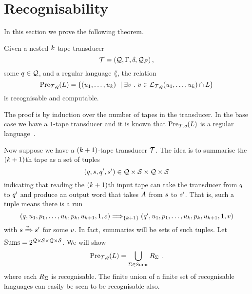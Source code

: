
\section{Recognisability}

In this section we prove the following theorem.

\begin{theorem}
    Given a nested $k$-tape transducer
    \[
        \mathcal{T} = \left(\mathcal{Q}, \Gamma, \delta, \mathcal{Q}_F\right),
    \]
    some
    $q \in \mathcal{Q}$,
    and a regular language $\lang$, the relation
    \[
        \preimage{\ducer}{\tstate}{\lang} =
        \setcomp{
            \tup{\iword_1, \ldots, \iword_\numtapes}
        }{
            \exists \oword\ .\ %
                \oword \in
                    \tlangof{\ducer}
                            {\tstate}
                            {\iword_1, \ldots, \iword_\numtapes}
                    \cap
                    \lang
        }
    \]
    is recognisable and computable.
\end{theorem}

The proof is by induction over the number of tapes in the transducer.
In the base case we have a $1$-tape transducer and it is known that
${\text{Pre}_{\mathcal{T},q}}\mathord{\left(L\right)}$
is a regular language~\cite{??}.

Now suppose we have a $(k+1)$-tape transducer $\mathcal{T}$.
The idea is to summarise the $(k+1)$th tape as a set of tuples
\[
    \left(q, s, q', s'\right)
    \in
    \mathcal{Q} \times \mathcal{S} \times \mathcal{Q} \times \mathcal{S}
\]
indicating that reading the $(k+1)$th input tape can take the transducer from $q$ to $q'$ and produce an output word that takes $A$ from $s$ to $s'$.
That is, such a tuple means there is a run
\[
    \left(
        q,
        u_1, p_1,
        \ldots,
        u_k, p_k,
        u_{k+1}, 1,
        \varepsilon
    \right)
    \Longrightarrow_{\left\{k+1\right\}}
    \left(
        q',
        u_1, p_1,
        \ldots,
        u_k, p_k,
        u_{k+1}, 1,
        v
    \right)
\]
with
$s \xRightarrow{v} s'$
for some $v$.
In fact, summaries will be sets of such tuples.
Let
$\text{Sums} = 2^{\mathcal{Q} \times \mathcal{S} \times \mathcal{Q} \times \mathcal{S}}$.
We will show
\[
    {\text{Pre}_{\mathcal{T},q}}\mathord{\left(L\right)} =
        \bigcup\limits_{\Sigma \in \text{Sums}}
            R_\Sigma \ .
\]
where each $R_\Sigma$ is recognisable.
The finite union of a finite set of recognisable languages can easily be seen to be recognisable also.

